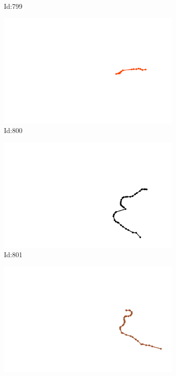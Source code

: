 \documentclass[12pt,twoside]{report}
\begin{document}
\begin{figure}
\begin{subfigure}[b]{0.20\textwidth}
\caption{Id:799}
\end{subfigure}
\begin{subfigure}[b]{0.20\textwidth}
\centering
\includegraphics[width=\textwidth]{../trajectories/800.png}
\caption{Id:800}
\end{subfigure}
\begin{subfigure}[b]{0.20\textwidth}
\centering
\includegraphics[width=\textwidth]{../trajectories/801.png}
\caption{Id:801}
\end{subfigure}
\begin{subfigure}[b]{0.20\textwidth}
\centering
\includegraphics[width=\textwidth]{../trajectories/831.png}

\end{subfigure}
\end{figure}
\end{document}
